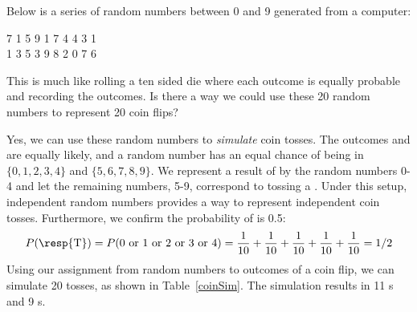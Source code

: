 \begin{example}{Below is a series of random numbers between 0 and 9 generated from a computer:
\begin{center}
7 1 5 9 1 7 4 4 3 1 \\
1 3 5 3 9 8 2 0 7 6 \\
\end{center}
This is much like rolling a ten sided die where each outcome is equally probable and recording the outcomes. Is there a way we could use these 20 random numbers to represent 20 coin flips?}\label{coinSimExam}
Yes, we can use these random numbers to \emph{simulate} coin tosses. The outcomes  and  are equally likely, and a random number has an equal chance of being in $\{0, 1, 2, 3, 4\}$ %
and $\{5, 6, 7, 8, 9\}$.%
 We represent a result of  by the random numbers {0}-{4} and let the remaining numbers, {5}-{9}, correspond to tossing a . Under this setup, independent random numbers provides a way to represent independent coin tosses. Furthermore, we confirm the probability of  is 0.5:
\begin{eqnarray*}
P(\text{\resp{T}}) = P(\text{0 or 1 or 2 or 3 or 4})  %
= \frac{1}{10} + \frac{1}{10} + \frac{1}{10} + \frac{1}{10} + \frac{1}{10} = 1/2
\end{eqnarray*}
Using our assignment from random numbers to outcomes of a coin flip, we can simulate 20 tosses, as shown in Table~\ref{coinSim}. The simulation results in 11 s and 9 s.
\end{example}
